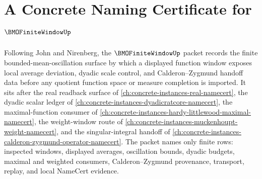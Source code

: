 \chapter{A Concrete Naming Certificate for $\BMOFiniteWindowUp$}
\label{ch:concrete-instances-bmo-finite-window-namecert}

Following John and Nirenberg, the $\BMOFiniteWindowUp$ packet records the finite bounded-mean-oscillation surface by which a displayed function window exposes local average deviation, dyadic scale control, and Calderon--Zygmund handoff data before any quotient function space or measure completion is imported. It sits after the real readback surface of \autoref{ch:concrete-instances-real-namecert}, the dyadic scalar ledger of \autoref{ch:concrete-instances-dyadicratcore-namecert}, the maximal-function consumer of \autoref{ch:concrete-instances-hardy-littlewood-maximal-namecert}, the weight-window route of \autoref{ch:concrete-instances-muckenhoupt-weight-namecert}, and the singular-integral handoff of \autoref{ch:concrete-instances-calderon-zygmund-operator-namecert}. The packet names only finite rows: inspected windows, displayed averages, oscillation bounds, dyadic budgets, maximal and weighted consumers, Calderon--Zygmund provenance, transport, replay, and local NameCert evidence.

